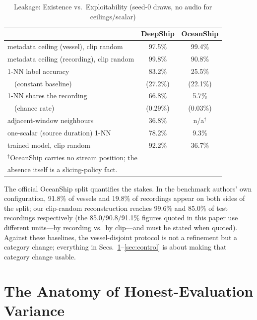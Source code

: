 ﻿\documentclass[journal]{IEEEtran}
\begin{document}
\begin{table}[!t]
\caption{Leakage: Existence vs.\ Exploitability (seed-0 draws, no audio for ceilings/scalar)}
\label{tab:leak}
\centering
\footnotesize\setlength{\tabcolsep}{3.2pt}
\begin{tabular}{lcc}
\toprule
 & DeepShip & OceanShip \\
\midrule
metadata ceiling (vessel), clip random   & 97.5\% & 99.4\% \\
metadata ceiling (recording), clip random & 99.8\% & 90.8\% \\
1-NN label accuracy                      & 83.2\% & 25.5\% \\
\ \ (constant baseline)                 & (27.2\%) & (22.1\%) \\
1-NN shares the recording                & 66.8\% & 5.7\% \\
\ \ (chance rate)                       & (0.29\%) & (0.03\%) \\
adjacent-window neighbours               & 36.8\% & n/a$^{\dagger}$ \\
one-scalar (source duration) 1-NN        & 78.2\% & 9.3\% \\
trained model, clip random               & 92.2\% & 36.7\% \\
\bottomrule
\multicolumn{3}{l}{\footnotesize $^{\dagger}$OceanShip carries no stream position; the}\\
\multicolumn{3}{l}{\footnotesize absence itself is a slicing-policy fact.}
\end{tabular}
\end{table}

The official OceanShip split quantifies the stakes. In the benchmark authors' own configuration,
91.8\% of vessels and 19.8\% of recordings appear on both sides of the split; our clip-random
reconstruction reaches 99.6\% and 85.0\% of test recordings respectively (the 85.0/90.8/91.1\%
figures quoted in this paper use different units---by recording vs.\ by clip---and must be stated
when quoted). Against these baselines, the vessel-disjoint protocol is not a refinement but a
category change; everything in Secs.~\ref{sec:variance}--\ref{sec:control} is about making that
category change usable.

\section{The Anatomy of Honest-Evaluation Variance}
\label{sec:variance}
\end{document}
